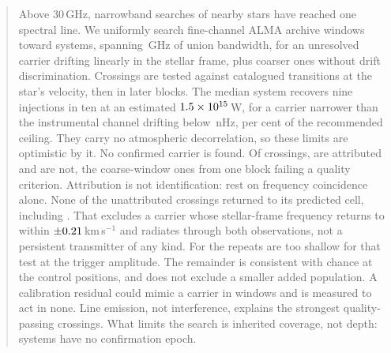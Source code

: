 \begin{abstract}
Above 30\,GHz, narrowband searches of nearby stars have reached one spectral
line.
We uniformly search \NWinA{} fine-channel ALMA archive windows toward
\NSysClassA{} systems, spanning \CvUnionA\,GHz of union bandwidth, for an
unresolved carrier drifting linearly in the
stellar frame, plus \NWinB{} coarser ones without drift discrimination.
Crossings are tested against catalogued transitions at the star's velocity,
then in later blocks.
The median system recovers nine injections in ten at an estimated
$\EirpNinetySysMedA$\,W, for a carrier narrower than the instrumental channel
drifting below \DriftCeilLo\,nHz, \AccelSheikhPct{} per cent of the
recommended ceiling. They carry no atmospheric decorrelation, so these limits
are optimistic by it.
No confirmed carrier is found. Of \EvNCrossRaw{} crossings, \MkAttr{} are
attributed and \MkUnattr{} are not, the \PrFlagXrossWord{} coarse-window ones
from one block failing a quality criterion. Attribution is not identification:
\LnAttrCoincWord{} rest on frequency coincidence alone.
None of the unattributed crossings returned to its predicted
cell, including \PrRankClause. That excludes a carrier whose stellar-frame frequency returns
to within $\pm\RqDvMed$\,km\,s$^{-1}$ and radiates through both observations,
not a persistent transmitter of any kind. For \RcNPowerLoTrig{} the repeats
are too shallow for that test at the trigger amplitude.
The remainder is consistent with chance at the control positions, and does not
exclude a smaller added population. A calibration residual could mimic a
carrier in \CxNAdmit{} windows and is measured to act in none.
Line emission, not interference, explains the strongest quality-passing
crossings. What limits the search is inherited coverage, not depth:
\ZcNoRepSys{} systems have no confirmation epoch.
\end{abstract}


